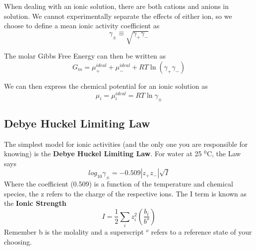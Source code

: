 \documentclass{article}
\newcommand{\be}{\begin{equation}}
\newcommand{\ee}{\end{equation}}
\begin{document}
When dealing with an ionic solution, there are both cations and anions in solution. 
We cannot experimentally separate the effects of either ion, so we choose to define a mean ionic activity coefficient as 
\be
\gamma_{\pm} \equiv \sqrt{\gamma_+ \gamma_-}
\ee

The molar Gibbs Free Energy can then be written as
\be
G_m = \mu_+^{ideal} + \mu_-^{ideal} + RT\ln(\gamma_+\gamma_-)
\ee

We can then express the chemical potential for an ionic solution as
\be
\mu_i = \mu_i^{ideal} = RT\ln \gamma_\pm
\ee

\subsection*{Debye Huckel Limiting Law}
The simplest model for ionic activities (and the only one you are responsible for knowing) is the \textbf{Debye Huckel Limiting Law}.
For water at 25 $^0$C, the Law says
\be
log_{10}\gamma_\pm = -0.509|z_+z_-|\sqrt{I}
\ee
Where the coefficient (0.509) is a function of the temperature and chemical species, the z refers to the charge of the respective ions. 
The I term is known as the \textbf{Ionic Strength}
\be
I = \frac{1}{2}\sum_i z_i^2 \left(\frac{b_i}{b^o}\right)
\ee
Remember b is the molality and a superscript $^o$ refers to a reference state of your choosing. 
\end{document}
